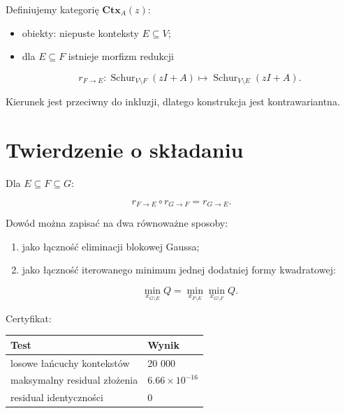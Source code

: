 \documentclass[11pt,a4paper,openany]{report}
\begin{document}
Definiujemy kategorię \(\mathbf{Ctx}_A(z)\):

\begin{itemize}
\item 
obiekty: niepuste konteksty \(E\subseteq V\);

\item 
dla \(E\subseteq F\) istnieje morfizm redukcji

\[
  r_{F\to E}:
  \operatorname{Schur}_{V\setminus F}(zI+A)
  \longmapsto
  \operatorname{Schur}_{V\setminus E}(zI+A).
  \]

\end{itemize}

Kierunek jest przeciwny do inkluzji, dlatego konstrukcja jest kontrawariantna.

\section{Twierdzenie o składaniu}

Dla \(E\subseteq F\subseteq G\):

\[
r_{F\to E}\circ r_{G\to F}=r_{G\to E}.
\]

Dowód mo\.zna zapisać na dwa równowa\.zne sposoby:

\begin{enumerate}
\item 
jako łączność eliminacji blokowej Gaussa;

\item 
jako łączność iterowanego minimum jednej dodatniej formy kwadratowej:

\[
   \min_{x_{G\setminus E}}Q
   =
   \min_{x_{F\setminus E}}
   \min_{x_{G\setminus F}}Q.
   \]

\end{enumerate}

Certyfikat:

\begin{center}
\begingroup\small
\setlength{\tabcolsep}{2.5pt}
\renewcommand{\arraystretch}{1.16}
\begin{longtable}{@{}p{}p{}@{}}
\toprule
\textbf{Test} & \textbf{Wynik} \\
\midrule
\endhead
losowe łańcuchy kontekstów & 20 000 \\
maksymalny residual zło\.zenia & \(6.66\times10^{-16}\) \\
residual identyczności & 0 \\
\bottomrule
\end{longtable}
\endgroup
\end{center}
\end{document}
